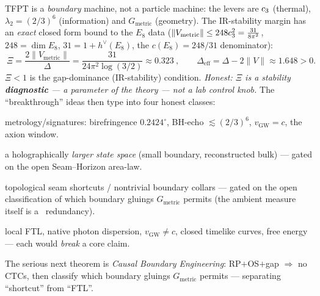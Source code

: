 \begin{keybox}
TFPT is a \emph{boundary} machine, not a particle machine: the levers are $c_3$ (thermal),
$\lambda_2{=}(2/3)^6$ (information) and $G_{\mathrm{metric}}$ (geometry). The IR-stability margin has an
\emph{exact} closed form bound to the $E_8$ data ($\|V_{\mathrm{metric}}\|\le248c_3^2=\tfrac{31}{8\pi^2}$,
$248{=}\dim E_8$, $31{=}1{+}h^\vee(E_8)$, the $c(E_8){=}248/31$ denominator):
\[
  \boxed{\ \Xi=\frac{2\|V_{\mathrm{metric}}\|}{\Delta}=\frac{31}{24\pi^2\log(3/2)}\approx0.323\ },\qquad
  \Delta_{\mathrm{eff}}=\Delta-2\|V\|\approx1.648>0 .
\]
$\Xi<1$ is the gap-dominance (IR-stability) condition. \emph{Honest: $\Xi$ is a stability
\textbf{diagnostic} --- a parameter of the theory --- not a lab control knob.} The ``breakthrough'' ideas
then type into four honest classes:
\begin{description}[leftmargin=2.0em,style=nextline,itemsep=1pt]
\item[\textnormal{A --- allowed \& near \mE.}] metrology/signatures: birefringence $0.2424^\circ$, BH-echo $\lesssim(2/3)^6$, $v_{\mathrm{GW}}{=}c$, the axion window.
\item[\textnormal{B --- allowed as reconstruction \mO.}] a holographically \emph{larger state space} (small boundary, reconstructed bulk) --- gated on the open Seam--Horizon area-law.
\item[\textnormal{C --- only after Causal Boundary Engineering \mO.}] topological seam shortcuts / nontrivial boundary collars --- gated on the open classification of which boundary gluings $G_{\mathrm{metric}}$ permits (the ambient measure itself is a \mC\ redundancy).
\item[\textnormal{D --- currently forbidden.}] local FTL, native photon dispersion, $v_{\mathrm{GW}}{\neq}c$, closed timelike curves, free energy --- each would \emph{break} a core claim.
\end{description}
The serious next theorem is \emph{Causal Boundary Engineering}: RP$+$OS$+$gap $\Rightarrow$ no CTCs, then
classify which boundary gluings $G_{\mathrm{metric}}$ permits --- separating ``shortcut'' from ``FTL''.
\end{keybox}

